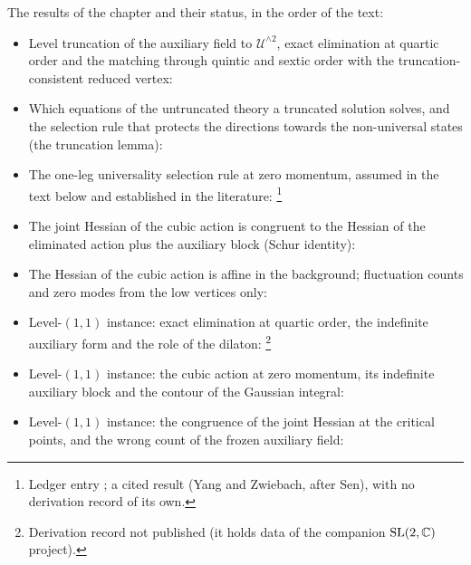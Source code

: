 The results of the chapter and their status, in the order of the text:
\begin{itemize}
  \setlength{\itemsep}{0.5ex}

  \item Level truncation of the auxiliary field to $\mathcal U^{\wedge 2}$, exact elimination at quartic order and the matching through quintic and sextic order with the truncation-consistent reduced vertex:

  \item Which equations of the untruncated theory a truncated solution solves, and the selection rule that protects the directions towards the non-universal states (the truncation lemma):

  \item The one-leg universality selection rule at zero momentum, assumed in the text below and established in the literature:
  \footnote{Ledger entry ; a cited result (Yang and Zwiebach, after Sen), with no derivation record of its own.}

  \item The joint Hessian of the cubic action is congruent to the Hessian of the eliminated action plus the auxiliary block (Schur identity):

  \item The Hessian of the cubic action is affine in the background; fluctuation counts and zero modes from the low vertices only:

  \item Level-$(1, 1)$ instance: exact elimination at quartic order, the indefinite auxiliary form and the role of the dilaton:
  \footnote{Derivation record not published (it holds data of the companion $\mathrm{SL}(2, \mathbb{C})$ project).}

  \item Level-$(1, 1)$ instance: the cubic action at zero momentum, its indefinite auxiliary block and the contour of the Gaussian integral:

  \item Level-$(1, 1)$ instance: the congruence of the joint Hessian at the critical points, and the wrong count of the frozen auxiliary field:


\end{itemize}
